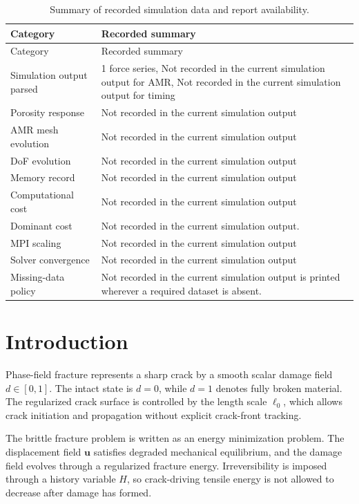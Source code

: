 \documentclass[11pt,a4paper]{report}
\begin{document}
\begin{longtable}{p{}p{}}
\caption{Summary of recorded simulation data and report availability.}
\label{tab:executive-summary}\\
\toprule
Category & Recorded summary\\
\midrule
\endfirsthead
\toprule
Category & Recorded summary\\
\midrule
\endhead
Simulation output parsed & 1 force series, Not recorded in the current simulation output for AMR, Not recorded in the current simulation output for timing\\
Porosity response & Not recorded in the current simulation output\\
AMR mesh evolution & Not recorded in the current simulation output\\
DoF evolution & Not recorded in the current simulation output\\
Memory record & Not recorded in the current simulation output\\
Computational cost & Not recorded in the current simulation output\\
Dominant cost & Not recorded in the current simulation output.\\
MPI scaling & Not recorded in the current simulation output\\
Solver convergence & Not recorded in the current simulation output\\
Missing-data policy & Not recorded in the current simulation output is printed wherever a required dataset is absent.\\
\bottomrule
\end{longtable}

\chapter{Introduction}
Phase-field fracture represents a sharp crack by a smooth scalar damage field $d\in[0,1]$. The intact state is $d=0$, while $d=1$ denotes fully broken material. The regularized crack surface is controlled by the length scale $\ell_0$, which allows crack initiation and propagation without explicit crack-front tracking.

The brittle fracture problem is written as an energy minimization problem. The displacement field $\bm{u}$ satisfies degraded mechanical equilibrium, and the damage field evolves through a regularized fracture energy. Irreversibility is imposed through a history variable $H$, so crack-driving tensile energy is not allowed to decrease after damage has formed.
\end{document}
